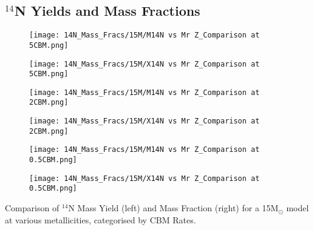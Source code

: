 \subsection{$^{14}$N Yields and Mass Fractions}
\begin{minipage}{\textwidth}
	\centering
	\begin{subfigure}{0.49\textwidth}
		\texttt{[image: 14N\_Mass\_Fracs/15M/M14N vs Mr Z\_Comparison at 5CBM.png]}
	\end{subfigure}
        \hfill
	\begin{subfigure}{0.49\textwidth}
		\texttt{[image: 14N\_Mass\_Fracs/15M/X14N vs Mr Z\_Comparison at 5CBM.png]}
	\end{subfigure}
        \label{fig:14N_15M_5CBM}
\end{minipage}
\begin{minipage}{\textwidth}
	\centering
	\begin{subfigure}{0.49\textwidth}
		\texttt{[image: 14N\_Mass\_Fracs/15M/M14N vs Mr Z\_Comparison at 2CBM.png]}
	\end{subfigure}
        \hfill
	\begin{subfigure}{0.49\textwidth}
		\texttt{[image: 14N\_Mass\_Fracs/15M/X14N vs Mr Z\_Comparison at 2CBM.png]}
	\end{subfigure}
        \label{fig:14N_15M_2CBM}
\end{minipage}
\begin{minipage}{\textwidth}
	\centering
	\begin{subfigure}{0.49\textwidth}
		\texttt{[image: 14N\_Mass\_Fracs/15M/M14N vs Mr Z\_Comparison at 0.5CBM.png]}
	\end{subfigure}
        \hfill
	\begin{subfigure}{0.49\textwidth}
		\texttt{[image: 14N\_Mass\_Fracs/15M/X14N vs Mr Z\_Comparison at 0.5CBM.png]}
	\end{subfigure}
	 \caption{Comparison of $^{14}$N Mass Yield (left) and Mass Fraction (right) for a 15M$_\odot$ model at various metallicities, categorised by CBM Rates.}
        \label{fig:14N_15M_0.5CBM}
\end{minipage}

